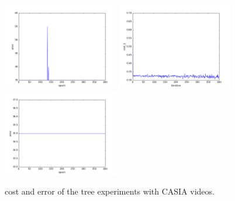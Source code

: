 \begin{figure}[htb]
\includegraphics[width=0.45\textwidth]{images/redes/ejecucion1/general_svm_casia_video/minidataset_tested_itself/error.png}
\includegraphics[width=0.45\textwidth]{images/redes/ejecucion1/general_svm_casia_video/minidataset_tested_iteself_lr_0_001/cost.png}
\includegraphics[width=0.45\textwidth]{images/redes/ejecucion1/general_svm_casia_video/minidataset_tested_iteself_lr_0_001/error.png}
\caption{cost and error of the tree experiments with CASIA videos.} \label{fig:casiavid-ejec1}
\end{figure}

